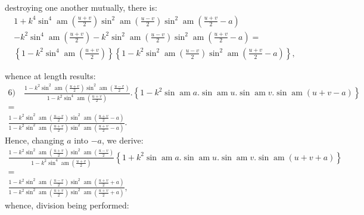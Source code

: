 \documentclass{article}
\begin{document}
destroying one another mutually, there is:
\[
\begin{gathered}
1+k^{4}\sin^{4}\operatorname{am}\left(\frac{u+v}{2}\right)\sin^{2}\operatorname{am}\left(\frac{u-v}{2}\right)\sin^{2}\operatorname{am}\left(\frac{u+v}{2}-a\right)\\[1.5ex]
-k^{2}\sin^{4}\operatorname{am}\left(\frac{u+v}{2}\right)-k^{2}\sin^{2}\operatorname{am}\left(\frac{u-v}{2}\right)\sin^{2}\operatorname{am}\left(\frac{u+v}{2}-a\right)=\\[1.5ex]
\left\{1-k^{2}\sin^{4}\operatorname{am}\left(\frac{u+v}{2}\right)\right\}\left\{1-k^{2}\sin^{2}\operatorname{am}\left(\frac{u-v}{2}\right)\sin^{2}\operatorname{am}\left(\frac{u+v}{2}-a\right)\right\},
\end{gathered}
\]

whence at length results:
\[
\begin{gathered}
\text{6)}\quad \frac{1-k^{2}\sin^{2}\operatorname{am}\left(\frac{u+v}{2}\right)\sin^{2}\operatorname{am}\left(\frac{u-v}{2}\right)}{1-k^{2}\sin^{4}\operatorname{am}\left(\frac{u+v}{2}\right)}.\left\{1-k^{2}\sin\operatorname{am}a.\sin\operatorname{am}u.\sin\operatorname{am}v.\sin\operatorname{am}(u+v-a)\right\}\\[1.5ex]
=\\[1.5ex]
\frac{1-k^{2}\sin^{2}\operatorname{am}\left(\frac{u-v}{2}\right)\sin^{2}\operatorname{am}\left(\frac{u+v}{2}-a\right)}{1-k^{2}\sin^{2}\operatorname{am}\left(\frac{u+v}{2}\right)\sin^{2}\operatorname{am}\left(\frac{u+v}{2}-a\right)}.
\end{gathered}
\]
Hence, changing $a$ into $-a$, we derive:
\[
\begin{gathered}
\frac{1-k^{2}\sin^{2}\operatorname{am}\left(\frac{u+v}{2}\right)\sin^{2}\operatorname{am}\left(\frac{u-v}{2}\right)}{1-k^{2}\sin^{4}\operatorname{am}\left(\frac{u+v}{2}\right)}\left\{1+k^{2}\sin\operatorname{am}a.\sin\operatorname{am}u.\sin\operatorname{am}v.\sin\operatorname{am}(u+v+a)\right\}\\[1.5ex]
=\\[1.5ex]
\frac{1-k^{2}\sin^{2}\operatorname{am}\left(\frac{u-v}{2}\right)\sin^{2}\operatorname{am}\left(\frac{u+v}{2}+a\right)}{1-k^{2}\sin^{2}\operatorname{am}\left(\frac{u+v}{2}\right)\sin^{2}\operatorname{am}\left(\frac{u+v}{2}+a\right)},
\end{gathered}
\]
whence, division being performed:
\end{document}

